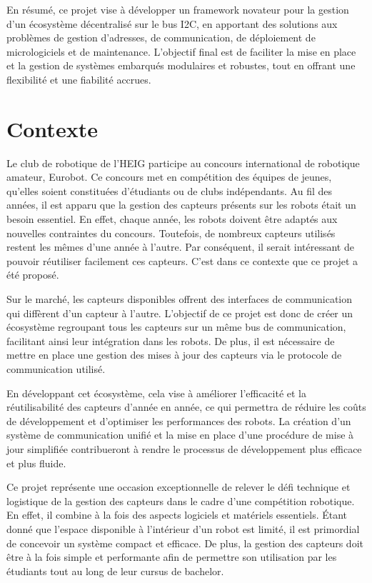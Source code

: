 En résumé, ce projet vise à développer un framework novateur pour la gestion d'un écosystème décentralisé sur le bus I2C, en apportant des solutions aux problèmes de gestion d'adresses, de communication, de déploiement de micrologiciels et de maintenance.
L'objectif final est de faciliter la mise en place et la gestion de systèmes embarqués modulaires et robustes, tout en offrant une flexibilité et une fiabilité accrues.

\section{Contexte}
Le club de robotique de l'HEIG participe au concours international de robotique amateur, Eurobot.
Ce concours met en compétition des équipes de jeunes, qu'elles soient constituées d'étudiants ou de clubs indépendants.
Au fil des années, il est apparu que la gestion des capteurs présents sur les robots était un besoin essentiel.
En effet, chaque année, les robots doivent être adaptés aux nouvelles contraintes du concours.
Toutefois, de nombreux capteurs utilisés restent les mêmes d'une année à l'autre.
Par conséquent, il serait intéressant de pouvoir réutiliser facilement ces capteurs.
C'est dans ce contexte que ce projet a été proposé.

Sur le marché, les capteurs disponibles offrent des interfaces de communication qui diffèrent d'un capteur à l'autre.
L'objectif de ce projet est donc de créer un écosystème regroupant tous les capteurs sur un même bus de communication, facilitant ainsi leur intégration dans les robots.
De plus, il est nécessaire de mettre en place une gestion des mises à jour des capteurs via le protocole de communication utilisé.

En développant cet écosystème, cela vise à améliorer l'efficacité et la réutilisabilité des capteurs d'année en année, ce qui permettra de réduire les coûts de développement et d'optimiser les performances des robots.
La création d'un système de communication unifié et la mise en place d'une procédure de mise à jour simplifiée contribueront à rendre le processus de développement plus efficace et plus fluide.

Ce projet représente une occasion exceptionnelle de relever le défi technique et logistique de la gestion des capteurs dans le cadre d'une compétition robotique.
En effet, il combine à la fois des aspects logiciels et matériels essentiels.
Étant donné que l'espace disponible à l'intérieur d'un robot est limité, il est primordial de concevoir un système compact et efficace.
De plus, la gestion des capteurs doit être à la fois simple et performante afin de permettre son utilisation par les étudiants tout au long de leur cursus de bachelor.